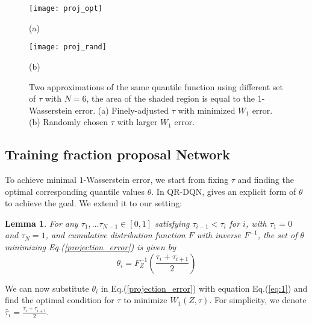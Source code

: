 \documentclass{article}
\newtheorem{lemma}{Lemma}
\begin{document}
\begin{figure}[!htb]
   \begin{minipage}{0.48\textwidth}
     \centering
     \texttt{[image: proj\_opt]}
     \caption*{(a)}
   \end{minipage}\hfill
   \begin{minipage}{0.48\textwidth}
     \centering
     \texttt{[image: proj\_rand]}
     \caption*{(b)}
   \end{minipage}
   \caption{Two approximations of the same quantile function using different set of $\tau$ with $N=6$, the area of the shaded region is equal to the 1-Wasserstein error. (a) Finely-adjusted $\tau$ with minimized $W_1$ error. (b) Randomly chosen $\tau$ with larger $W_1$ error.}
   \label{fig:proj}
\end{figure}

\subsection{Training fraction proposal Network}
To achieve minimal $1$-Wasserstein error, we start from fixing $\tau$ and finding the optimal corresponding quantile values $\theta$. In QR-DQN, \cite{dabney2018implicit} gives an explicit form of $\theta$ to achieve the goal. We extend it to our setting:

\begin{lemma}
\label{lemma:1}
\citep{dabney2018implicit} For any $\tau_1,...\tau_{N-1} \in [0,1]$ satisfying $\tau_{i-1} < \tau_i$ for $i$, with $\tau_1=0$ and $\tau_N=1$, and cumulative distribution function $F$ with inverse $F^{-1}$, the set of $\theta$ minimizing Eq.(\ref{projection_error})
is given by 
\begin{equation}
\label{eq:1}
    \theta_{i}=F^{-1}_{Z}(\frac{\tau_i+\tau_{i+1}}{2})
\end{equation}
\end{lemma}

We can now substitute $\theta_i$ in Eq.(\ref{projection_error}) with equation Eq.(\ref{eq:1}) and find the optimal condition for $\tau$ to minimize $W_1(Z,\tau)$. For simplicity, we denote $\hat{\tau}_i=\frac{\tau_i+\tau_{i+1}}{2}$.
\end{document}
